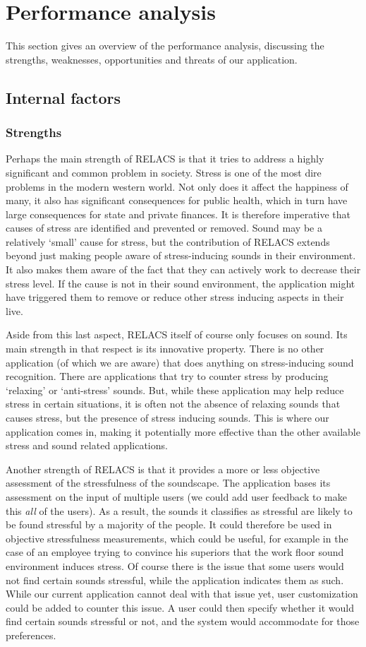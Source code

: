 \documentclass[a4paper]{article}
\begin{document}
\section{Performance analysis}
This section gives an overview of the performance analysis, discussing the strengths, weaknesses, opportunities and threats of our application.

\subsection{Internal factors}
\subsubsection{Strengths}
Perhaps the main strength of RELACS is that it tries to address a highly significant and common problem in society.
Stress is one of the most dire problems in the modern western world.
Not only does it affect the happiness of many, it also has significant consequences for public health, which in turn have large consequences for state and private finances.
It is therefore imperative that causes of stress are identified and prevented or removed.
Sound may be a relatively `small' cause for stress, but the contribution of RELACS extends beyond just making people aware of stress-inducing sounds in their environment.
It also makes them aware of the fact that they can actively work to decrease their stress level.
If the cause is not in their sound environment, the application might have triggered them to remove or reduce other stress inducing aspects in their live.

Aside from this last aspect, RELACS itself of course only focuses on sound.
Its main strength in that respect is its innovative property.
There is no other application (of which we are aware) that does anything on stress-inducing sound recognition.
There are applications that try to counter stress by producing `relaxing' or `anti-stress' sounds.
But, while these application may help reduce stress in certain situations, it is often not the absence of relaxing sounds that causes stress, but the presence of stress inducing sounds.
This is where our application comes in, making it potentially more effective than the other available stress and sound related applications.

Another strength of RELACS is that it provides a more or less objective assessment of the stressfulness of the soundscape.
The application bases its assessment on the input of multiple users (we could add user feedback to make this \textit{all} of the users).
As a result, the sounds it classifies as stressful are likely to be found stressful by a majority of the people.
It could therefore be used in objective stressfulness measurements, which could be useful,
for example in the case of an employee trying to convince his superiors that the work floor sound environment induces stress.
Of course there is the issue that some users would not find certain sounds stressful, while the application indicates them as such.
While our current application cannot deal with that issue yet, user customization could be added to counter this issue.
A user could then specify whether it would find certain sounds stressful or not, and the system would accommodate for those preferences.
\end{document}
